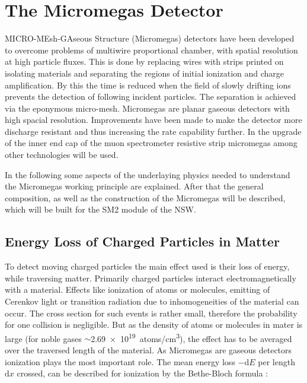 \documentclass[
a4paper,                                %
twoside,                                %
BCOR1.4cm,                      %
10pt,                           %
headings=normal,                %
headsepline,                    %
clearplainpage, %
final,                                  %
div=14,
parskip=full,
openright,
bibliography=toc
]{scrreprt}
\begin{document}
\chapter{The Micromegas Detector}\label{MMprinciple}

MICRO-MEsh-GAseous Structure (Micromegas) detectors have been developed to overcome problems of multiwire proportional chamber, with spatial resolution at high particle fluxes. This is done by replacing wires with strips printed on isolating materials and separating the regions of initial ionization and charge amplification. By this the time is reduced when the field of slowly drifting ions prevents the detection of following incident particles. The separation is achieved via the eponymous micro-mesh. \cite{micromegas} Micromegas are planar gaseous detectors with high spacial resolution. Improvements have been made to make the detector more discharge resistant and thus increasing the rate capability further. In the upgrade of the inner end cap of the muon spectrometer resistive strip micromegas among other technologies will be used.

In the following some aspects of the underlaying physics needed to understand the Micromegas working principle are explained. After that the general composition, as well as the construction of the Micromegas will be described, which will be built for the SM2 module of the NSW. 

\section{Energy Loss of Charged Particles in Matter}\label{energyLoss}

To detect moving charged particles the main effect used is their loss of energy, while traversing matter. 
Primarily charged particles interact electromagnetically with a material. Effects like ionization of atoms or molecules, emitting of Cerenkov light or transition radiation due to inhomogeneities of the material can occur. 
The cross section for such events is rather small, therefore the probability for one collision is negligible. But as the density of atoms or molecules in mater is large (for noble gases $\sim$\SI{2.69e19}{atoms/\cm\cubed}), the effect has to be averaged over the traversed length of the material. As Micromegas are gaseous detectors ionization plays the most important role. The mean energy loss $-\mathrm{d}E$ per length $\mathrm{d}x$ crossed, can be described for ionization by the Bethe-Bloch formula \cite{bethe}:  
\end{document}
